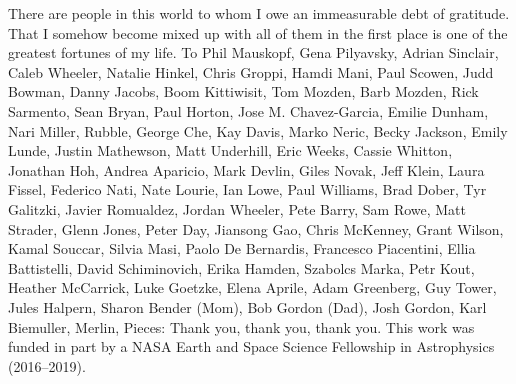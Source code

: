 There are people in this world to whom I owe an immeasurable debt of gratitude. That I somehow become mixed up with all of them in the first place is one of the greatest fortunes of my life.
\newline\newline
To Phil Mauskopf, Gena Pilyavsky, Adrian Sinclair, Caleb Wheeler, Natalie Hinkel, Chris Groppi, Hamdi Mani, Paul Scowen, Judd Bowman, Danny Jacobs, Boom Kittiwisit, Tom Mozden, Barb Mozden, Rick Sarmento, Sean Bryan, Paul Horton, Jose M. Chavez-Garcia, Emilie Dunham, Nari Miller, Rubble, George Che, Kay Davis, Marko Neric, Becky Jackson, Emily Lunde, Justin Mathewson, Matt Underhill, Eric Weeks, Cassie Whitton, Jonathan Hoh, Andrea Aparicio, Mark Devlin, Giles Novak, Jeff Klein, Laura Fissel, Federico Nati, Nate Lourie, Ian Lowe, Paul Williams, Brad Dober, Tyr Galitzki, Javier Romualdez, Jordan Wheeler, Pete Barry, Sam Rowe, Matt Strader, Glenn Jones, Peter Day, Jiansong Gao, Chris McKenney, Grant Wilson, Kamal Souccar, Silvia Masi, Paolo De Bernardis, Francesco Piacentini, Ellia Battistelli, David Schiminovich, Erika Hamden, Szabolcs Marka, Petr Kout, Heather McCarrick, Luke Goetzke, Elena Aprile, Adam Greenberg, Guy Tower, Jules Halpern, Sharon Bender (Mom), Bob Gordon (Dad), Josh Gordon, Karl Biemuller, Merlin, Pieces:
\newline\newline
Thank you, thank you, thank you.
\newline\newline
\noindent This work was funded in part by a NASA Earth and Space Science Fellowship in Astrophysics (2016--2019).

